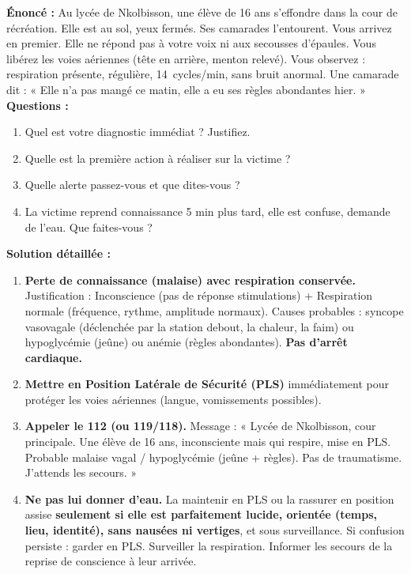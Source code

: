 \documentclass[11pt]{article}
\newcommand{\cle}[1]{{\popxbold\color{popdark}#1}}
\begin{document}
\begin{exoresolu}
\textbf{Énoncé :} Au lycée de Nkolbisson, une élève de 16 ans s'effondre dans la cour de récréation. Elle est au sol, yeux fermés. Ses camarades l'entourent. Vous arrivez en premier. Elle ne répond pas à votre voix ni aux secousses d'épaules. Vous libérez les voies aériennes (tête en arrière, menton relevé). Vous observez : respiration présente, régulière, \SI{14}{cycles/min}, sans bruit anormal. Une camarade dit : « Elle n'a pas mangé ce matin, elle a eu ses règles abondantes hier. »
\textbf{Questions :}
\begin{enumerate}
    \item Quel est votre diagnostic immédiat ? Justifiez.
    \item Quelle est la première action à réaliser sur la victime ?
    \item Quelle alerte passez-vous et que dites-vous ?
    \item La victime reprend connaissance 5 min plus tard, elle est confuse, demande de l'eau. Que faites-vous ?
\end{enumerate}
\textbf{Solution détaillée :}
\begin{enumerate}
    \item \textbf{Perte de connaissance (malaise) avec respiration conservée.} Justification : Inconscience (pas de réponse stimulations) + Respiration normale (fréquence, rythme, amplitude normaux). Causes probables : \cle{syncope vasovagale} (déclenchée par la station debout, la chaleur, la faim) ou \cle{hypoglycémie} (jeûne) ou \cle{anémie} (règles abondantes). \textbf{Pas d'arrêt cardiaque.}
    \item \textbf{Mettre en Position Latérale de Sécurité (PLS)} immédiatement pour protéger les voies aériennes (langue, vomissements possibles).
    \item \textbf{Appeler le 112 (ou 119/118).} Message : « Lycée de Nkolbisson, cour principale. Une élève de 16 ans, inconsciente mais qui respire, mise en PLS. Probable malaise vagal / hypoglycémie (jeûne + règles). Pas de traumatisme. J'attends les secours. »
    \item \textbf{Ne pas lui donner d'eau.} La maintenir en PLS ou la rassurer en position assise \textbf{seulement si elle est parfaitement lucide, orientée (temps, lieu, identité), sans nausées ni vertiges}, et sous surveillance. Si confusion persiste : garder en PLS. Surveiller la respiration. Informer les secours de la reprise de conscience à leur arrivée.
\end{enumerate}
\end{exoresolu}
\end{document}
